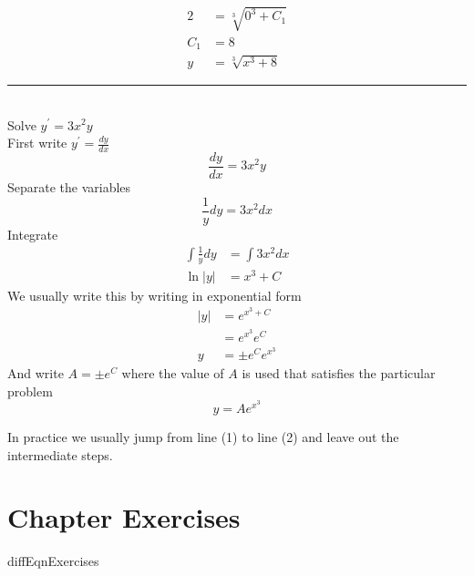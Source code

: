 \begin{align*}2 &    = \sqrt[{3}]{0^{3} +C_{1}} \\
C_{1} &    = 8 \\
y &    = \sqrt[{3}]{x^{3} +8}\end{align*}
\rule{\textwidth}{0.5pt}\\
\example Solve $\displaystyle y^{ \prime } =3 x^{2} y$ \medskip\\
\solution First write $y^{ \prime } =\frac{d y}{d x}$ 
\begin{equation*}\frac{d y}{d x} =3 x^{2} y
\end{equation*}Separate the variables
\begin{equation*}\frac{1}{y} d y =3 x^{2} d x
\end{equation*}Integrate
\begin{align}\int \frac{1}{y} d y &    = \int 3 x^{2} d x \nonumber  \\
\ln  \left \vert y\right \vert  &    = x^{3} +C \tag{1}\end{align}We usually write this by writing in exponential form
\begin{align*}\left \vert y\right \vert  &    = e^{x^{3} +C} \\
 &    = e^{x^{3}} e^{C} \\
y &    =  \pm e^{C} e^{x^{3}}\end{align*}And write $A = \pm e^{C}$ where the value of $A$ is used that satisfies the particular problem
\begin{equation}y =A e^{x^{3}}\tag{2}
\end{equation}

In practice we usually jump from line (1) to line (2) and leave out the intermediate steps. 

\section{Chapter Exercises}
{diffEqnExercises}

